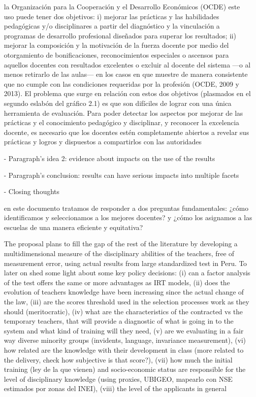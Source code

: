 la Organización para la Cooperación y el Desarrollo Económicos (OCDE) este uso puede tener dos objetivos: i) mejorar las prácticas y las habilidades pedagógicas y/o disciplinares a partir del diagnóstico y la vinculación a programas de desarrollo profesional diseñados para superar los resultados; ii) mejorar la composición y la motivación de la fuerza docente por medio del otorgamiento de bonificaciones, reconocimientos especiales o ascensos para aquellos docentes con resultados excelentes o excluir al docente del sistema —o al menos retirarlo de las aulas— en los casos en que muestre de manera consistente que no cumple con las condiciones requeridas por la profesión (OCDE, 2009 y 2013).
El problema que surge en relación con estos dos objetivos (plasmados en el segundo eslabón del gráfico 2.1) es que son difíciles de lograr con una única herramienta de evaluación.
Para poder detectar los aspectos por mejorar de las prácticas y el conocimiento pedagógico y disciplinar, y reconocer la excelencia docente, es necesario que los docentes estén completamente abiertos a revelar sus prácticas y logros y dispuestos a compartirlos con las autoridades \citep{Hincapie_et_al_2020}


- Paragraph's idea 2: evidence about impacts on the use of the results


- Paragraph's conclusion: results can have serious impacts into multiple facets




- Closing thoughts

en este documento tratamos de responder a dos preguntas fundamentales: ¿cómo identificamos y seleccionamos a los mejores docentes? y ¿cómo los asignamos a las escuelas de una manera eficiente y equitativa? \citep{Bertoni_et_al_2020b}





The proposal plans to fill the gap of the rest of the literature by developing a multidimensional measure of the disciplinary abilities of the teachers, free of measurement error, using actual results from large standardized test in Peru. To later on shed some light about some key policy decisions: (i) can a factor analysis of the test offers the same or more advantages as IRT models, (ii) does the evolution of teachers knowledge have been increasing since the actual change of the law, (iii) are the scores threshold used in the selection processes work as they should (meritocratic), (iv) what are the characteristics of the contracted vs the temporary teachers, that will provide a diagnostic of what is going in to the system and what kind of training will they need, (v) are we evaluating in a fair way diverse minority groups (invidents, language, invariance measurement), (vi) how related are the knowledge with their development in class (more related to the delivery, check how subjective is that score?), (vii) how much the initial training (ley de la que vienen) and socio-economic status are responsible for the level of disciplinary knowledge (using proxies, UBIGEO, mapearlo con NSE estimados por zonas del INEI), (viii) the level of the applicants in general





